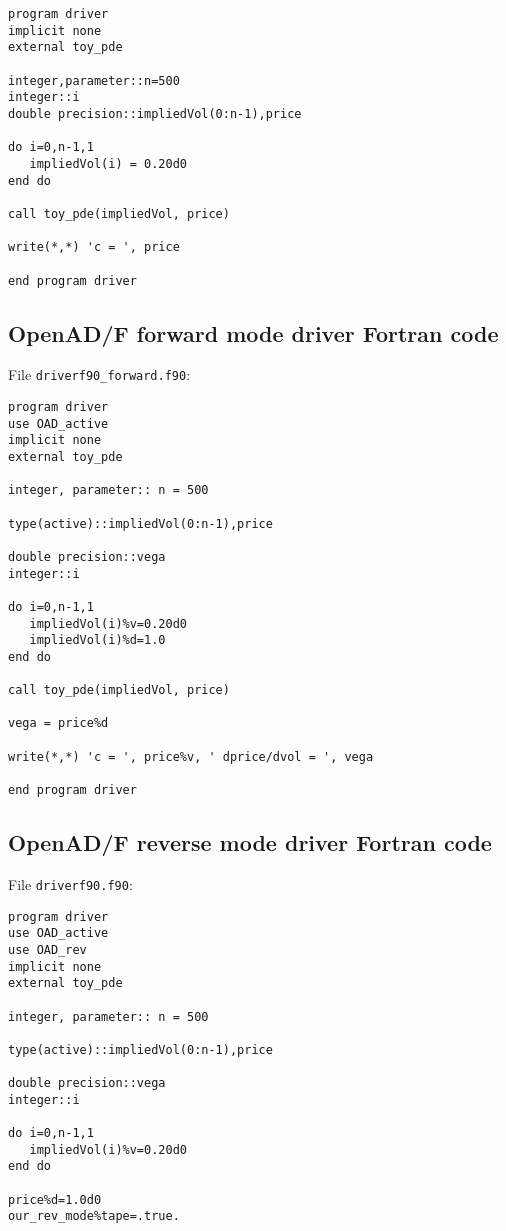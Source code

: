\documentclass{amsart}
\theoremstyle{plain}
\numberwithin{equation}{section}
\begin{document}
\begin{appendix}
\begin{verbatim}
program driver
implicit none
external toy_pde

integer,parameter::n=500
integer::i
double precision::impliedVol(0:n-1),price

do i=0,n-1,1
   impliedVol(i) = 0.20d0
end do

call toy_pde(impliedVol, price)

write(*,*) 'c = ', price

end program driver
\end{verbatim}

\subsection{OpenAD/F forward mode driver Fortran code}

File \verb+driverf90_forward.f90+:

\begin{verbatim}
program driver
use OAD_active
implicit none
external toy_pde

integer, parameter:: n = 500

type(active)::impliedVol(0:n-1),price

double precision::vega
integer::i

do i=0,n-1,1
   impliedVol(i)%v=0.20d0
   impliedVol(i)%d=1.0
end do

call toy_pde(impliedVol, price)

vega = price%d

write(*,*) 'c = ', price%v, ' dprice/dvol = ', vega

end program driver
\end{verbatim}

\subsection{OpenAD/F reverse mode driver Fortran code}

File \verb+driverf90.f90+:

\begin{verbatim}
program driver
use OAD_active
use OAD_rev
implicit none
external toy_pde

integer, parameter:: n = 500

type(active)::impliedVol(0:n-1),price

double precision::vega
integer::i

do i=0,n-1,1
   impliedVol(i)%v=0.20d0
end do

price%d=1.0d0
our_rev_mode%tape=.true.


\end{verbatim}
\end{appendix}
\end{document}
